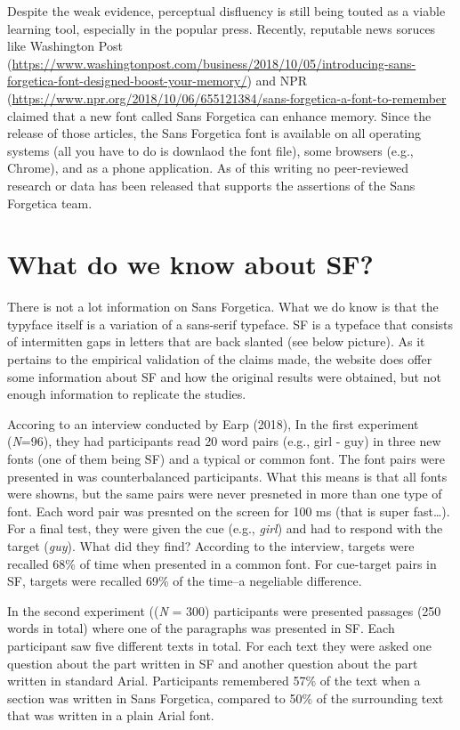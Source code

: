 \documentclass[pdf]{apa6}
\begin{document}
Despite the weak evidence, perceptual disfluency is still being touted as a viable learning tool, especially in the popular press. Recently, reputable news soruces like Washington Post (\url{https://www.washingtonpost.com/business/2018/10/05/introducing-sans-forgetica-font-designed-boost-your-memory/}) and NPR (\url{https://www.npr.org/2018/10/06/655121384/sans-forgetica-a-font-to-remember} claimed that a new font called Sans Forgetica can enhance memory. Since the release of those articles, the Sans Forgetica font is available on all operating systems (all you have to do is downlaod the font file), some browsers (e.g., Chrome), and as a phone application. As of this writing no peer-reviewed research or data has been released that supports the assertions of the Sans Forgetica team.

\hypertarget{what-do-we-know-about-sf}{%
\section{What do we know about SF?}\label{what-do-we-know-about-sf}}

There is not a lot information on Sans Forgetica. What we do know is that the typyface itself is a variation of a sans-serif typeface. SF is a typeface that consists of intermitten gaps in letters that are back slanted (see below picture). As it pertains to the empirical validation of the claims made, the website does offer some information about SF and how the original results were obtained, but not enough information to replicate the studies.

Accoring to an interview conducted by Earp (2018), In the first experiment (\emph{N}=96), they had participants read 20 word pairs (e.g., girl - guy) in three new fonts (one of them being SF) and a typical or common font. The font pairs were presented in was counterbalanced participants. What this means is that all fonts were showns, but the same pairs were never presneted in more than one type of font. Each word pair was presnted on the screen for 100 ms (that is super fast\ldots{}). For a final test, they were given the cue (e.g., \emph{girl}) and had to respond with the target (\emph{guy}). What did they find? According to the interview, targets were recalled 68\% of time when presented in a common font. For cue-target pairs in SF, targets were recalled 69\% of the time--a negeliable difference.

In the second experiment ((\emph{N} = 300) participants were presented passages (250 words in total) where one of the paragraphs was presented in SF. Each participant saw five different texts in total. For each text they were asked one question about the part written in SF and another question about the part written in standard Arial. Participants remembered 57\% of the text when a section was written in Sans Forgetica, compared to 50\% of the surrounding text that was written in a plain Arial font.
\end{document}
